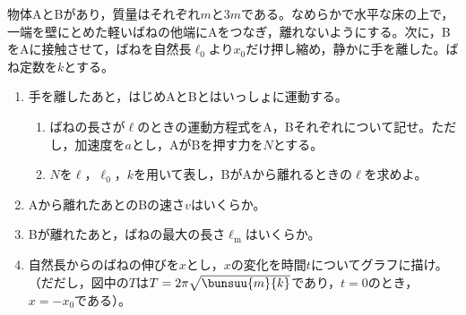 \hakosyokika
\item
    \begin{mawarikomi}{150pt}{}
        物体AとBがあり，質量はそれぞれ$m$と$3m$である。なめらかで水平な床の上で，一端を壁にとめた軽いばねの他端にAをつなぎ，離れないようにする。次に，BをAに接触させて，ばねを自然長$\ell _0$より$x_0$だけ押し縮め，静かに手を離した。ばね定数を$k$とする。
        \begin{enumerate}
            \item 手を離したあと，はじめAとBとはいっしょに運動する。
            \begin{enumerate}
                \item ばねの長さが$\ell $のときの運動方程式をA，Bそれぞれについて記せ。ただし，加速度を$a$とし，AがBを押す力を$N$とする。
                \item $N$を$\ell $，$\ell _0$，$k$を用いて表し，BがAから離れるときの$\ell $を求めよ。
            \end{enumerate}
            \item Aから離れたあとのBの速さ$v$はいくらか。
            \item Bが離れたあと，ばねの最大の長さ$\ell _\mathrm{m}$はいくらか。
            \item 自然長からのばねの伸びを$x$とし，$x$の変化を時間$t$についてグラフに描け。（だだし，図中の$T$は$T=2\pi \sqrt{\bunsuu{m}{k}}$であり，$t=0$のとき，$x=-x_0$である）。
        \end{enumerate}
    \end{mawarikomi}